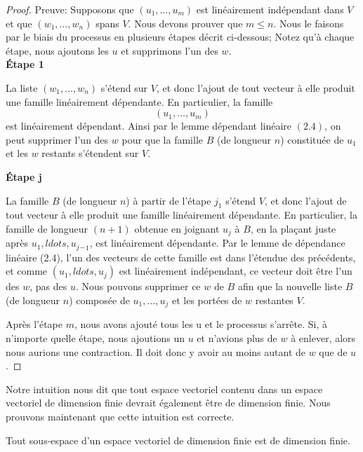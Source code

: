 \documentclass[12pt]{book}
\begin{document}
\begin{proof} Preuve: Supposons que $(u_1,\ldots,u_m)$ est lin\'eairement ind\'ependant dans $V$ et que $(w_1,\dots,w_n)$ spans $V$. Nous devons prouver que $m\le n$. Nous le faisons par le biais du processus en plusieurs \'etapes d\'ecrit ci-dessous; Notez qu’\`a chaque \'etape, nous ajoutons les $u$ et supprimons l’un des $w$.\\
\textbf{\'Etape 1}
\begin{indpar}
La liste $(w_1,\ldots,w_n)$ s’\'etend sur $V$, et donc l’ajout de tout vecteur \`a elle produit une famille lin\'eairement d\'ependante. En particulier, la famille
\begin{equation*}
    (u_1,\ldots,u_m)
\end{equation*}
est linéairement d\'ependant. Ainsi par le lemme d\'ependant lin\'eaire $(2.4)$, on peut supprimer l’un des $w$ pour que la famille $B$ (de longueur $n$) constitu\'ee de $u_1$ et les $w$ restants s’\'etendent sur $V$.
\end{indpar}


\textbf{\'Etape j} 
\begin{indpar}
La famille $B$ (de longueur $n$) \`a partir de l’\'etape $j_1$ s’\'etend $V$, et donc l’ajout de tout vecteur \`a elle produit une famille lin\'eairement d\'ependante. En particulier, la famille de longueur $(n + 1)$ obtenue en joignant $u_j$ \`a $B$, en la plaçant juste apr\`es $u_1,ldots,u_j{_-}_1$, est lin\'eairement d\'ependante. Par le lemme de d\'ependance lin\'eaire (2.4), l’un des vecteurs de cette famille est dans l’\'etendue des pr\'ec\'edents, et comme $(u_1,ldots,u_j)$ est lin\'eairement ind\'ependant, ce vecteur doit \^etre l’un des $w$, pas des $u$. Nous pouvons supprimer ce $w$ de $B$ afin que la nouvelle liste $B$ (de longueur $n$) compos\'ee de $u_1,\ldots,u_j$ et les port\'ees de $w$ restantes $V$.\\
\end{indpar}


Apr\`es l’\'etape $m $, nous avons ajout\'e tous les u et le processus s’arr\^ete. Si, \`a n’importe quelle \'etape, nous ajoutions un $u $ et n’avions plus de $w$ \`a enlever, alors nous aurions une contraction. Il doit donc y avoir au moins autant de $w$ que de $u$.
\end{proof}
Notre intuition nous dit que tout espace vectoriel contenu dans un espace vectoriel de dimension finie devrait \'egalement \^etre de dimension finie. Nous prouvons maintenant que cette intuition est correcte.
\begin{prop}
Tout sous-espace d’un espace vectoriel de dimension finie est de dimension finie.
\end{prop}
\end{document}
